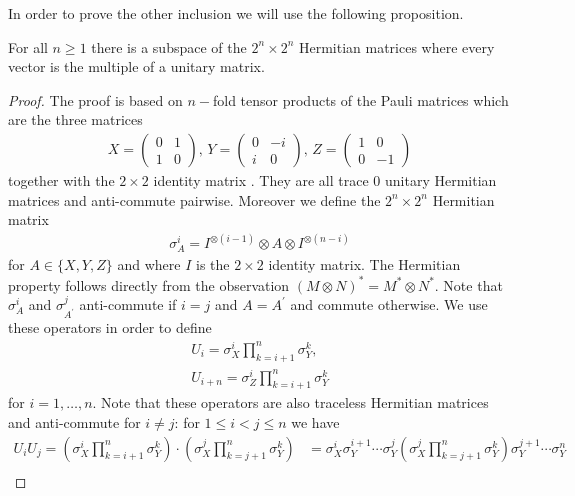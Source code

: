 In order to prove the other inclusion we will use the following proposition. 
\begin{prop} \label{PauliProp}
	For all $ n \ge 1 $ there is a subspace of the $ 2^n \times 2^n $ Hermitian matrices where every vector is the multiple of a unitary matrix. 
\end{prop}
	\begin{proof}
		The proof is based on $ n- $fold tensor products of the Pauli matrices which are the three matrices 
		\begin{align*}
		X = \begin{pmatrix}
		0 & 1 \\ 1 & 0
		\end{pmatrix}, \, Y = \begin{pmatrix}
		0 & -i \\ i & 0
		\end{pmatrix}, \, Z = \begin{pmatrix}
		1 & 0 \\ 0 & -1
		\end{pmatrix}
		\end{align*}
		together with the $ 2 \times 2 $ identity matrix .
		They are all trace $ 0 $ unitary Hermitian matrices and anti-commute pairwise. 
		Moreover we define the $ 2^n \times 2^n $ Hermitian matrix 
		\begin{align*}
		\sigma_A^i = I^{\otimes (i-1)} \otimes A \otimes I^{\otimes (n-i)}
		\end{align*}
		for $ A \in \{ X,Y,Z \}$ and where $ I $ is the $ 2 \times 2 $ identity matrix. The Hermitian property follows directly from the observation $ (M \otimes N)^* = M^* \otimes N^* $.
		Note that $ \sigma_A^i $ and $ \sigma_{A^{\prime}}^j $ anti-commute if $ i = j $ and $ A = A^{\prime} $ and commute otherwise. We use these operators in order to define 
		\begin{align*}
		U_i = \sigma_X^i \prod_{k = i+1}^{n}\sigma_Y^k,  \\
		U_{i+n} = \sigma_Z^i \prod_{k = i+1}^n \sigma_Y^k
		\end{align*}
		for $ i = 1,\hdots,n $. Note that these operators are also traceless Hermitian matrices and anti-commute for $ i \neq j $:    
		for $ 1 \le i < j  \le n$ we have 
		\begin{align*}
		U_iU_j = (\sigma_X^i \prod_{k = i+1}^{n}\sigma_Y^k) \cdot( \sigma_X^j \prod_{k = j+1}^{n}\sigma_Y^k) &= \sigma_X^i \sigma_Y^{i+1} \cdots \sigma_Y^j ( \sigma_X^j \prod_{k = j+1}^{n}\sigma_Y^k) \sigma_Y^{j+1} \cdots \sigma_Y^n \\

\end{align*}
\end{proof}
